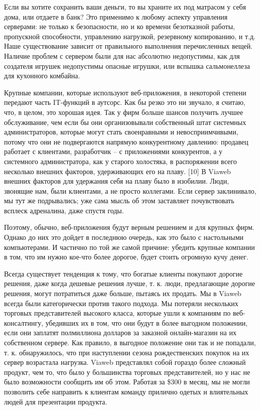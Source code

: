 \documentclass[ebook,12pt,oneside,openany]{memoir}
\begin{document}
Если вы хотите сохранить ваши деньги, то вы храните их под матрасом у
себя дома, или отдаете в банк? Это применимо к любому аспекту
управления серверами: не только к безопасности, но и ко времени
безотказной работы, пропускной способности, управлению нагрузкой,
резервному копированию, и т.д. Наше существование зависит от
правильного выполнения перечисленных вещей. Наличие проблем с сервером
были для нас абсолютно недопустимы, как для создателя игрушек
недопустимы опасные игрушки, или вспышка сальмонеллеза для кухонного
комбайна.

Крупные компании, которые используют веб-приложения, в некоторой
степени передают часть IT-функций в аутсорс. Как бы резко это ни
звучало, я считаю, что, в целом, это хорошая идея. Так у фирм больше
шансов получить лучшее обслуживание, чем если бы они организовывали
собственный штат системных администраторов, которые могут стать
своенравными и невосприимчивыми, потому что они не подвергаются
напрямую конкурентному давлению: продавец работает с клиентами,
разработчик – с приложениями конкурентов, а у системного
администратора, как у старого холостяка, в распоряжении всего
несколько внешних факторов, удерживающих его на плаву. [10] В Viaweb
внешних факторов для удержания себя на плаву было в изобилии. Люди,
звонящие нам, были клиентами, а не просто коллегами. Если сервер
заклинивало, мы тут же подрывались; уже сама мысль об этом заставляет
почувствовать всплеск адреналина, даже спустя годы.

Поэтому, обычно, веб-приложения будут верным решением и для крупных
фирм. Однако до них это дойдет в последнюю очередь, как это было с
настольными компьютерами. И частично по той же самой причине: убедить
крупные компании в том, что им нужно кое-что более дорогое, будет
стоить огромную кучу денег.

Всегда существует тенденция к тому, что богатые клиенты покупают
дорогие решения, даже когда дешевые решения лучше, т. к. люди,
предлагающие дорогие решения, могут потратиться даже больше, пытаясь
их продать. Мы в Viaweb всегда были категорически против такого
подхода. Мы потеряли нескольких торговых представителей высокого
класса, которые ушли к компаниям по веб-консалтингу, убедивших их в
том, что они будут в более выгодном положении, если они заплатят
полмиллиона долларов за заказной онлайн-магазин на их собственном
сервере. Как правило, в выгодное положение они так и не попадали, т.
к. обнаружилось, что при наступлении сезона рождественских покупок на
их сервер возрастала нагрузка. Viaweb представлял собой гораздо более
сложный продукт, чем то, что было у большинства торговых
представителей, но у нас не было возможности сообщить им об этом.
Работая за \$300 в месяц, мы не могли позволить себе направить к
клиентам команду прилично одетых и влиятельных людей для презентации
продукта.
\end{document}
